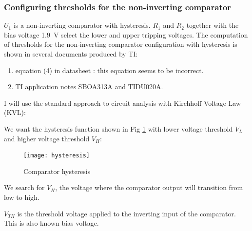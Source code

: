 \subsubsection {Configuring thresholds for the non-inverting comparator} \label{threshold}

$U_1$ is a non-inverting comparator with hysteresis. $R_{1}$ and $R_{2}$ together with the
bias voltage \qty{1.9}{\V}
select the lower and upper tripping voltages.
The computation of thresholds for the non-inverting comparator configuration with hysteresis is shown
in several documents produced by TI:

\begin{enumerate}
    \item  equation (4) in datasheet \cite{noauthor_tlv703x_2021}: this equation   seems to be incorrect.
    \item  TI application notes SBOA313A and TIDU020A.
\end{enumerate}

I will use the standard approach to circuit
analysis with Kirchhoff Voltage Law (KVL):

We want the hysteresis function shown in Fig \ref{fig:ch} with lower voltage threshold $V_L$ and higher voltage threshold $V_H$:


\begin{figure}[h]
    \centering
    \texttt{[image: hysteresis]}
    \caption{Comparator hysteresis}
    \label{fig:ch}
\end{figure}


We search for $V_H$, the voltage where the comparator output will transition from low to high.

$V_{TH}$ is the threshold voltage applied to the inverting input of the comparator. This is also known bias voltage.




